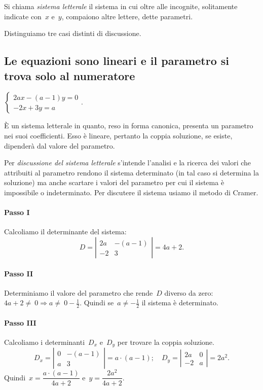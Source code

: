  \begin{definizione}
 Si chiama \emph{sistema letterale} il sistema in cui
oltre alle incognite, solitamente indicate con~$x$ e~$y$, compaiono altre
lettere, dette parametri.
 \end{definizione}

Distinguiamo tre casi distinti di discussione.

\subsection*{Le equazioni sono lineari e il parametro si trova solo al numeratore}

\begin{exrig}\vspace{1.10ex}
 \begin{esempio}
 $\left\{\begin{array}{l}{2ax-(a-1)y=0}\\{-2x+3y=a}\end{array}\right..$


È un sistema letterale in quanto, reso in forma
canonica, presenta un parametro nei suoi coefficienti. Esso è
lineare, pertanto la coppia soluzione, se esiste, dipenderà dal
valore del parametro.

Per \emph{discussione del sistema letterale} s'intende
l'analisi e la ricerca dei valori che attribuiti al
parametro rendono il sistema determinato (in tal caso si determina la
soluzione) ma anche scartare i valori del parametro per cui il sistema
è impossibile o indeterminato.
Per discutere il sistema usiamo il metodo di Cramer.

\paragraph{Passo I} Calcoliamo il determinante del sistema:
\[D=\left|\begin{array}{cc}{2a}&{-(a-1)}\\{-2}&{3}\end{array}\right|=4a+2.\]

\paragraph{Passo II} Determiniamo il valore del parametro che
rende~$D$ diverso da zero:~$4a+2\neq~0\Rightarrow a\neq~0-\frac{1}{2}$. Quindi se~$a\neq -{\frac{1}{2}}$ il sistema è
determinato.

\paragraph{Passo III} Calcoliamo i determinanti~$D_{x}$
e~$D_{y}$ per trovare la coppia soluzione.
\[D_{x}=\left|\begin{array}{cc}{0}&{-(a-1)}\\{a}&{3}\end{array}\right|=a\cdot (a-1);\quad
D_{y}=\left|\begin{array}{cc}{2a}&{0}\\{-2}&{a}\end{array}\right|=2a^{2}.\]
Quindi~$x=\dfrac{a\cdot (a-1)}{4a+2}$ e~$y=\dfrac{2a^{2}}{4a+2}$.


\end{esempio}
\end{exrig}
